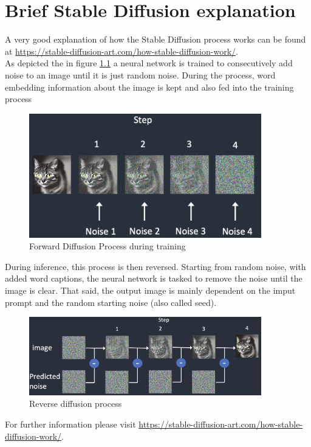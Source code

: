 \documentclass[
  a4paper,  %
  twoside,  %
  bibliography=totoc,
  headsepline,
  cleardoublepage=empty,
  parskip=half,
  draft=false
]{scrbook}
\begin{document}
\chapter{Brief Stable Diffusion explanation}
\label{app:diff-workflow}
A very good explanation of how the Stable Diffusion process works can be found at \url{https://stable-diffusion-art.com/how-stable-diffusion-work/}. \\
As depicted the in figure \ref{fig:forward-diff} a neural network is trained to consecutively add noise to an image until it is just random noise. During the process, word embedding information about the image is kept and also fed into the training process
\begin{figure}[h]
  \centering
  \includegraphics[width=0.9\textwidth]{./graphics/images/forward-diff.png}
  \caption{Forward Diffusion Process during training \cite{andrewHowDoesStable2022}}
  \label{fig:forward-diff}
\end{figure}

During inference, this process is then reversed. Starting from random noise, with added word captions, the neural network is tasked to remove the noise until the image is clear. That said, the output image is mainly dependent on the imput prompt and the random starting noise (also called seed).

\begin{figure}[h]
  \centering
  \includegraphics[width=0.9\textwidth]{./graphics/images/reverse-diff.png}
  \caption{Reverse diffusion process \cite{andrewHowDoesStable2022}}
  \label{fig:backward-diff}
\end{figure}

For further information please visit \url{https://stable-diffusion-art.com/how-stable-diffusion-work/}.



% 

\pagestyle{empty}
\renewcommand*{\chapterpagestyle}{empty}
\Affirmation
\end{document}

